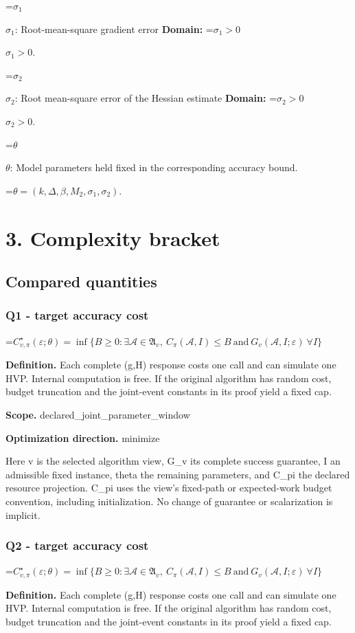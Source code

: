 \documentclass[10pt,a4paper]{article}
\newcommand{\AtlasMath}[1]{\par\begingroup\centering\setbox0=\hbox{$\displaystyle #1$}\ifdim\wd0>1.4\linewidth\typeout{ATLAS WIDE FORMULA: \the\wd0}\fi\ifdim\wd0>\linewidth\resizebox{\linewidth}{!}{\box0}\else\box0\fi\par\endgroup}
\newcommand{\AtlasInlineMath}[1]{\begingroup\setbox0=\hbox{$#1$}\ifdim\wd0>.4\linewidth\endgroup\AtlasMath{#1}\else\endgroup$#1$\fi}
\begin{document}
\AtlasInlineMath{\sigma_1}: Root-mean-square gradient error \textbf{Domain:} \AtlasInlineMath{\sigma_1>0}.

\AtlasInlineMath{\sigma_2}: Root mean-square error of the Hessian estimate \textbf{Domain:} \AtlasInlineMath{\sigma_2>0}.

\AtlasInlineMath{\theta}: Model parameters held fixed in the corresponding accuracy bound.


\AtlasMath{\theta=(k,\Delta,\beta,M_2,\sigma_1,\sigma_2).}


\section{3. Complexity bracket}
\subsection{Compared quantities}
\subsubsection{Q1 - target accuracy cost}
\AtlasMath{C^\star_{v,\pi}(\varepsilon;\theta)=\inf\{B\ge0:\exists\mathcal A\in\mathfrak A_v,\ C_\pi(\mathcal A,I)\le B\ \text{and}\ G_v(\mathcal A,I;\varepsilon)\ \forall I\}}
\textbf{Definition.} Each complete (g,H) response costs one call and can simulate one HVP. Internal computation is free. If the original algorithm has random cost, budget truncation and the joint-event constants in its proof yield a fixed cap.

\textbf{Scope.} declared\_joint\_parameter\_window

\textbf{Optimization direction.} minimize

Here v is the selected algorithm view, G\_v its complete success guarantee, I an admissible fixed instance, theta the remaining parameters, and C\_pi the declared resource projection. C\_pi uses the view's fixed-path or expected-work budget convention, including initialization. No change of guarantee or scalarization is implicit.

\subsubsection{Q2 - target accuracy cost}
\AtlasMath{C^\star_{v,\pi}(\varepsilon;\theta)=\inf\{B\ge0:\exists\mathcal A\in\mathfrak A_v,\ C_\pi(\mathcal A,I)\le B\ \text{and}\ G_v(\mathcal A,I;\varepsilon)\ \forall I\}}
\textbf{Definition.} Each complete (g,H) response costs one call and can simulate one HVP. Internal computation is free. If the original algorithm has random cost, budget truncation and the joint-event constants in its proof yield a fixed cap.
\end{document}
